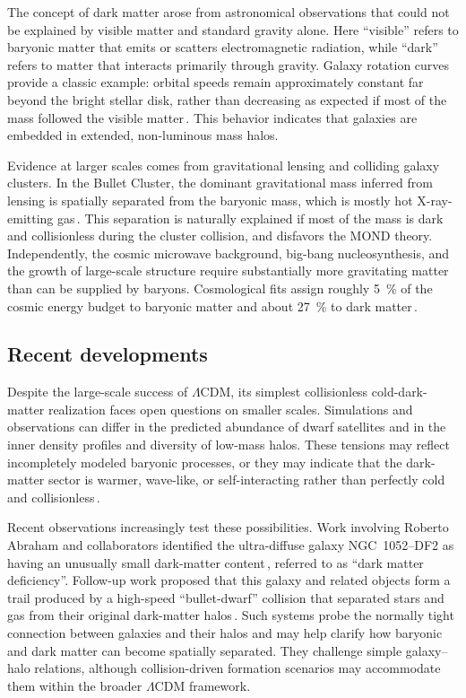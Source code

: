 The concept of dark matter arose from astronomical observations that could not be explained by visible matter and standard gravity alone.
Here ``visible'' refers to baryonic matter that emits or scatters electromagnetic radiation, while ``dark'' refers to matter that interacts primarily through gravity.
Galaxy rotation curves provide a classic example: orbital speeds remain approximately constant far beyond the bright stellar disk, rather than decreasing as expected if most of the mass followed the visible matter\,\cite{rubin1970rotation,Sofue_Rubin_2001_RotationCurves}.
This behavior indicates that galaxies are embedded in extended, non-luminous mass halos.

Evidence at larger scales comes from gravitational lensing and colliding galaxy clusters.
In the Bullet Cluster, the dominant gravitational mass inferred from lensing is spatially separated from the baryonic mass, which is mostly hot X-ray-emitting gas\,\cite{Clowe_2006_DirectEmpiricalProof}.
This separation is naturally explained if most of the mass is dark and collisionless during the cluster collision, and disfavors the MOND theory.
Independently, the cosmic microwave background, big-bang nucleosynthesis, and the growth of large-scale structure require substantially more gravitating matter than can be supplied by baryons.
Cosmological fits assign roughly \SI{5}{\%} of the cosmic energy budget to baryonic matter and about \SI{27}{\%} to dark matter\,\cite{ade2016planck}.


\subsection{Recent developments}

Despite the large-scale success of $\Lambda$CDM, its simplest collisionless cold-dark-matter realization faces open questions on smaller scales.
Simulations and observations can differ in the predicted abundance of dwarf satellites and in the inner density profiles and diversity of low-mass halos.
These tensions may reflect incompletely modeled baryonic processes, or they may indicate that the dark-matter sector is warmer, wave-like, or self-interacting rather than perfectly cold and collisionless\,\cite{Vegetti2026_ChallengeCDMWDM}.

Recent observations increasingly test these possibilities.
Work involving Roberto Abraham and collaborators identified the ultra-diffuse galaxy NGC~1052--DF2 as having an unusually small dark-matter content\,\cite{vanDokkum2018_DarkMatterDeficient}, referred to as ``dark matter deficiency''.
Follow-up work proposed that this galaxy and related objects form a trail produced by a high-speed ``bullet-dwarf'' collision that separated stars and gas from their original dark-matter halos\,\cite{vanDokkum2022_BulletDwarfTrail}.
Such systems probe the normally tight connection between galaxies and their halos and may help clarify how baryonic and dark matter can become spatially separated.
They challenge simple galaxy--halo relations, although collision-driven formation scenarios may accommodate them within the broader $\Lambda$CDM framework.

